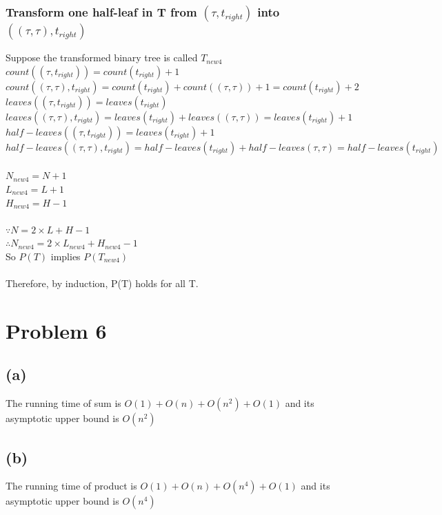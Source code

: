 \documentclass{article} %
\begin{document}
\subsubsection*{Transform one half-leaf in T from $(\tau, t_{right})$ into $((\tau,\tau), t_{right})$}
Suppose the transformed binary tree is called $T_{new4}$\\
$count((\tau, t_{right})) = count(t_{right}) + 1$\\
$count((\tau,\tau), t_{right}) = count(t_{right}) + count((\tau,\tau))+1 = count(t_{right}) + 2$\\
$leaves((\tau, t_{right})) = leaves(t_{right})$\\
$leaves((\tau,\tau), t_{right}) = leaves(t_{right}) + leaves((\tau,\tau)) = leaves(t_{right}) + 1$\\
$half-leaves((\tau, t_{right})) = leaves(t_{right}) + 1$\\
$half-leaves((\tau,\tau), t_{right}) = half-leaves(t_{right}) + half-leaves(\tau, \tau) = half-leaves(t_{right})$\\
\\
$N_{new4} = N + 1$\\
$L_{new4} = L + 1$\\
$H_{new4} = H - 1$\\
\\
$\because N = 2\times L + H - 1$\\
$\therefore N_{new4} = 2\times L_{new4} + H_{new4} - 1$\\
So $P(T)$ implies $P(T_{new4})$\\
\\
Therefore, by induction, P(T) holds for all T.\\

\section*{Problem 6}
\subsection*{(a)}
The running time of sum is $O(1)+O(n)+O(n^2)+O(1)$ and its asymptotic upper bound is $O(n^2)$\\
\subsection*{(b)}
The running time of product is $O(1)+O(n)+O(n^4)+O(1)$ and its asymptotic upper bound is $O(n^4)$\\
\end{document}
